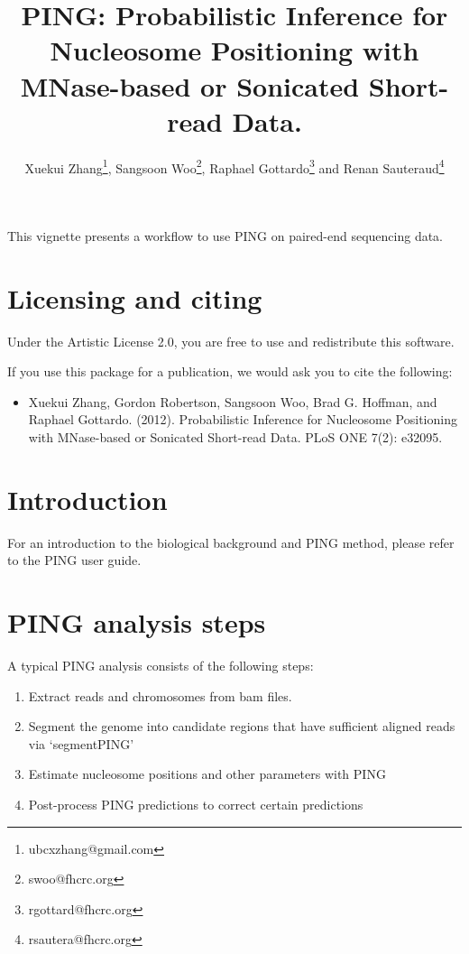 \documentclass[11pt]{article}
\author{Xuekui Zhang\footnote{ubcxzhang@gmail.com}, Sangsoon
Woo\footnote{swoo@fhcrc.org}, Raphael Gottardo\footnote{rgottard@fhcrc.org} and
Renan Sauteraud\footnote{rsautera@fhcrc.org}}
\begin{document}

\title{PING: Probabilistic Inference for Nucleosome Positioning with MNase-based or Sonicated Short-read Data.}
\maketitle



\textnormal {\normalfont}
This vignette presents a workflow to use PING on paired-end sequencing data.

\tableofcontents
\newpage


\section{Licensing and citing}

Under the Artistic License 2.0, you are free to use and redistribute this software. 

If you use this package for a publication, we would ask you to cite the following: 

\begin{itemize}
\item[] Xuekui Zhang, Gordon Robertson, Sangsoon Woo, Brad G. Hoffman, and Raphael Gottardo. (2012). Probabilistic Inference for Nucleosome Positioning with MNase-based or Sonicated Short-read Data. PLoS ONE 7(2): e32095.
\end{itemize}


\section{Introduction}
For an introduction to the biological background and PING method, please refer to the PING user guide.


\section{PING analysis steps}
A typical PING analysis consists of the following steps:
\begin{enumerate}
  \item Extract reads and chromosomes from bam files.
  \item Segment the genome into candidate regions that have sufficient aligned reads via `segmentPING'
  \item Estimate nucleosome positions and other parameters with PING
  \item Post-process PING predictions to correct certain predictions
\end{enumerate}
\end{document}
